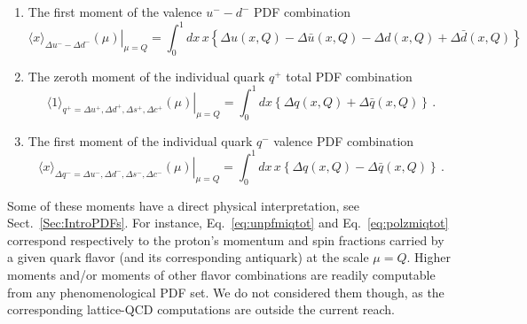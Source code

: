 \begin{itemize}
\begin{enumerate}
\item The first moment of the valence $u^--d^-$ PDF combination
\begin{equation}
\left.\langle x\rangle_{\Delta u^--\Delta d^-}(\mu)\right|_{\mu=Q}
=
\int_0^1 dx\, x\left\{\Delta u(x,Q)-\Delta\bar{u}(x,Q)-\Delta d(x,Q)+\Delta \bar{d}(x,Q)\right\}
\label{eq:polfmumdval}  
\end{equation}

\item The zeroth moment of the individual quark $q^+$ total PDF combination
\begin{equation}
\left.\langle 1\rangle_{q^+=\Delta u^+,\Delta d^+,\Delta s^+,\Delta c^+}(\mu)\right|_{\mu=Q}
=
\int_0^1 dx \left\{\Delta q(x,Q)+\Delta\bar{q}(x,Q)\right\} \, .
\label{eq:polzmiqtot}
\end{equation}

\item The first moment of the individual quark $q^-$ valence PDF combination
\begin{equation}
\left.\langle x\rangle_{\Delta q^-=\Delta u^-,\Delta d^-,\Delta s^-,\Delta c^-}(\mu)\right|_{\mu=Q}
=
\int_0^1 dx\, x\left\{\Delta q(x,Q)-\Delta\bar{q}(x,Q)\right\} \, .
\label{eq:polfmiqval}
\end{equation}

\end{enumerate}

\end{itemize}

Some of these moments have a direct physical interpretation, see 
Sect.~\ref{Sec:IntroPDFs}.
%
For instance, Eq.~\eqref{eq:unpfmiqtot} and Eq.~\eqref{eq:polzmiqtot}
correspond respectively to the proton's momentum and spin fractions carried
by a given quark flavor (and its corresponding antiquark) at the scale $\mu=Q$.
%
Higher moments and/or moments of other flavor combinations are readily
computable from any phenomenological PDF set.
%
We do not considered them though, as the corresponding lattice-QCD
computations are outside the current reach.
